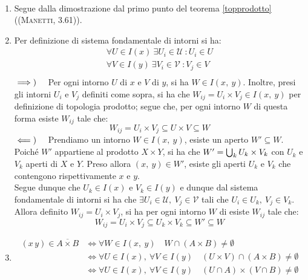 \begin{demonstration}~{}
\begin{enumerate}[label=\Roman*]
\item Segue dalla dimostrazione dal primo punto del teorema \ref{topprodotto} (\textsc{(Manetti, 3.61)}).
\item Per definizione di sistema fondamentale di intorni si ha:
\begin{gather*}
\forall U\in I\left(x\right)\ \exists U_i\in\mathcal{U}\ \colon U_i\in U\\
\forall V\in I\left(y\right)\ \exists V_i\in\mathcal{V}\ \colon V_j\in V\\
\end{gather*}
$\implies)\quad$ Per ogni intorno $U$ di $x$ e $V$ di $y$, si ha $W\in I\left(x,\ y\right)$. Inoltre, presi gli intorni $U_i$ e $V_j$ definiti come sopra, si ha che $W_{ij} = U_i \times V_j\in I\left(x,\ y\right)$ per definizione di topologia prodotto; segue che, per ogni intorno $W$ di questa forma esiste $W_{ij}$ tale che:
\begin{equation*}
W_{ij} = U_i \times V_j\subseteq U\times V\subseteq W
\end{equation*}
$\impliedby)\quad$ Prendiamo un intorno $W\in I\left(x,\ y\right)$, esiste un aperto $W'\subseteq W$. Poiché $W'$ appartiene al prodotto $X\times Y$, si ha che $W'=\mathop{{\bigcup}}\displaylimits_k U_k\times V_k$ con $U_k$ e $V_k$ aperti di $X$ e $Y$. Preso allora $\left(x,\ y\right)\in W'$, esiste gli aperti $U_k$ e $V_k$ che contengono rispettivamente $x$ e $y$.\\
Segue dunque che $U_k\in I\left(x\right)$ e $V_k\in I\left(y\right)$ e dunque dal sistema fondamentale di intorni si ha che $\exists U_i\in\mathcal{U},\ V_j\in\mathcal{V}$ tali che $U_i\in U_k,\  V_j\in V_k$. Allora definito $W_{ij} = U_i \times V_j$, si ha per ogni intorno $W$ di esiste $W_{ij}$ tale che:
\begin{equation*}
	W_{ij} = U_i \times V_j\subseteq U_k\times V_k\subseteq W'\subseteq W
\end{equation*}
\item \begin{align*}
\left(x\, y\right)\in \overline{A\times B}&\iff \forall W\in I\left(x,\ y\right)\quad W\cap\left(A\times B\right)\neq \emptyset\\
&\iff \forall U\in I\left(x\right),\ \forall V\in I\left(y\right)\quad \left(U\times V\right)\cap\left(A\times B\right)\neq \emptyset\\
&\iff \forall U\in I\left(x\right),\ \forall V\in I\left(y\right)\quad \left(U\cap A\right)\times\left(V\cap B\right)\neq \emptyset\\

\end{align*}
\end{enumerate}
\end{demonstration}
